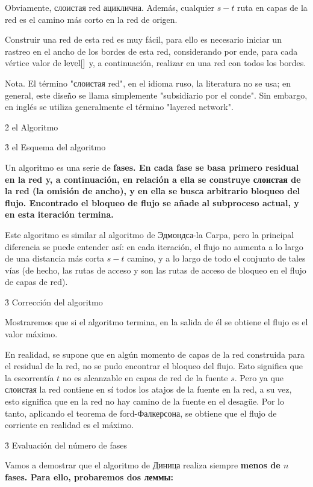 Obviamente, слоистая red ациклична. Además, cualquier $s-t$ ruta en capas de la red es el camino más corto en la red de origen.

Construir una red de esta red es muy fácil, para ello es necesario iniciar un rastreo en el ancho de los bordes de esta red, considerando por ende, para cada vértice valor de ${\rm level} []$ y, a continuación, realizar en una red con todos los bordes.

Nota. El término "слоистая red", en el idioma ruso, la literatura no se usa; en general, este diseño se llama simplemente "subsidiario por el conde". Sin embargo, en inglés se utiliza generalmente el término "layered network".



\h2{ el Algoritmo }


\h3{ el Esquema del algoritmo }

Un algoritmo es una serie de \bf{fases}. En cada fase se basa primero residual en la red y, a continuación, en relación a ella se construye слоистая de la red (la omisión de ancho), y en ella se busca arbitrario bloqueo del flujo. Encontrado el bloqueo de flujo se añade al subproceso actual, y en esta iteración termina.

Este algoritmo es similar al algoritmo de Эдмондса-la Carpa, pero la principal diferencia se puede entender así: en cada iteración, el flujo no aumenta a lo largo de una distancia más corta $s-t$ camino, y a lo largo de todo el conjunto de tales vías (de hecho, las rutas de acceso y son las rutas de acceso de bloqueo en el flujo de capas de red).


\h3{ Corrección del algoritmo }

Mostraremos que si el algoritmo termina, en la salida de él se obtiene el flujo es el valor máximo.

En realidad, se supone que en algún momento de capas de la red construida para el residual de la red, no se pudo encontrar el bloqueo del flujo. Esto significa que la escorrentía $t$ no es alcanzable en capas de red de la fuente $s$. Pero ya que слоистая la red contiene en sí todos los atajos de la fuente en la red, a su vez, esto significa que en la red no hay camino de la fuente en el desagüe. Por lo tanto, aplicando el teorema de ford-Фалкерсона, se obtiene que el flujo de corriente en realidad es el máximo.


\h3{ Evaluación del número de fases }

Vamos a demostrar que el algoritmo de Диница realiza siempre \bf{menos de $n$ fases}. Para ello, probaremos dos леммы:

